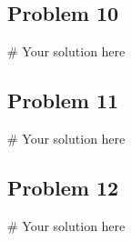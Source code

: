 \documentclass[
  letterpaper,
  DIV=11,
  numbers=noendperiod]{scrartcl}
\newenvironment{Shaded}{\begin{snugshade}}{\end{snugshade}}
\newcommand{\CommentTok}[1]{\textcolor[rgb]{0.37,0.37,0.37}{#1}}
\begin{document}
\subsection{Problem 10}\label{problem-10}

\begin{Shaded}
\begin{Highlighting}[]
\CommentTok{\# Your solution here}
\end{Highlighting}
\end{Shaded}

\subsection{Problem 11}\label{problem-11}

\begin{Shaded}
\begin{Highlighting}[]
\CommentTok{\# Your solution here}
\end{Highlighting}
\end{Shaded}

\subsection{Problem 12}\label{problem-12}

\begin{Shaded}
\begin{Highlighting}[]
\CommentTok{\# Your solution here}
\end{Highlighting}
\end{Shaded}
\end{document}
